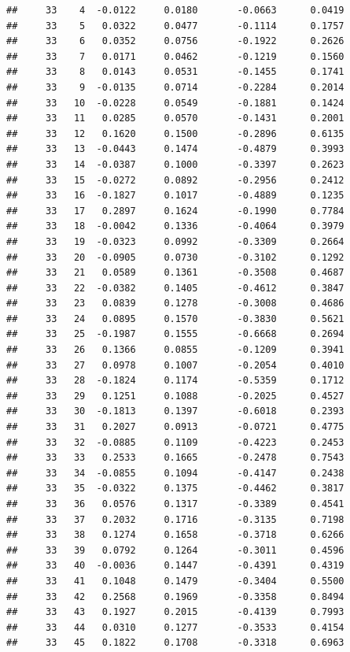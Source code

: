 \documentclass[
]{article}
\begin{document}
\begin{verbatim}
##     33    4  -0.0122     0.0180       -0.0663      0.0419  
##     33    5   0.0322     0.0477       -0.1114      0.1757  
##     33    6   0.0352     0.0756       -0.1922      0.2626  
##     33    7   0.0171     0.0462       -0.1219      0.1560  
##     33    8   0.0143     0.0531       -0.1455      0.1741  
##     33    9  -0.0135     0.0714       -0.2284      0.2014  
##     33   10  -0.0228     0.0549       -0.1881      0.1424  
##     33   11   0.0285     0.0570       -0.1431      0.2001  
##     33   12   0.1620     0.1500       -0.2896      0.6135  
##     33   13  -0.0443     0.1474       -0.4879      0.3993  
##     33   14  -0.0387     0.1000       -0.3397      0.2623  
##     33   15  -0.0272     0.0892       -0.2956      0.2412  
##     33   16  -0.1827     0.1017       -0.4889      0.1235  
##     33   17   0.2897     0.1624       -0.1990      0.7784  
##     33   18  -0.0042     0.1336       -0.4064      0.3979  
##     33   19  -0.0323     0.0992       -0.3309      0.2664  
##     33   20  -0.0905     0.0730       -0.3102      0.1292  
##     33   21   0.0589     0.1361       -0.3508      0.4687  
##     33   22  -0.0382     0.1405       -0.4612      0.3847  
##     33   23   0.0839     0.1278       -0.3008      0.4686  
##     33   24   0.0895     0.1570       -0.3830      0.5621  
##     33   25  -0.1987     0.1555       -0.6668      0.2694  
##     33   26   0.1366     0.0855       -0.1209      0.3941  
##     33   27   0.0978     0.1007       -0.2054      0.4010  
##     33   28  -0.1824     0.1174       -0.5359      0.1712  
##     33   29   0.1251     0.1088       -0.2025      0.4527  
##     33   30  -0.1813     0.1397       -0.6018      0.2393  
##     33   31   0.2027     0.0913       -0.0721      0.4775  
##     33   32  -0.0885     0.1109       -0.4223      0.2453  
##     33   33   0.2533     0.1665       -0.2478      0.7543  
##     33   34  -0.0855     0.1094       -0.4147      0.2438  
##     33   35  -0.0322     0.1375       -0.4462      0.3817  
##     33   36   0.0576     0.1317       -0.3389      0.4541  
##     33   37   0.2032     0.1716       -0.3135      0.7198  
##     33   38   0.1274     0.1658       -0.3718      0.6266  
##     33   39   0.0792     0.1264       -0.3011      0.4596  
##     33   40  -0.0036     0.1447       -0.4391      0.4319  
##     33   41   0.1048     0.1479       -0.3404      0.5500  
##     33   42   0.2568     0.1969       -0.3358      0.8494  
##     33   43   0.1927     0.2015       -0.4139      0.7993  
##     33   44   0.0310     0.1277       -0.3533      0.4154  
##     33   45   0.1822     0.1708       -0.3318      0.6963  

\end{verbatim}
\end{document}
